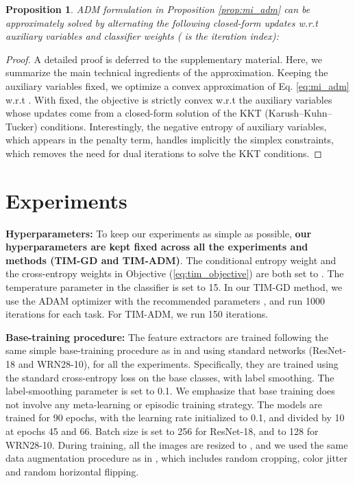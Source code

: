 \documentclass{article}
\newtheorem{prop}{Proposition}
\begin{document}
    		    \begin{prop}\label{prop:mi_adm_solution}
    		        ADM formulation in Proposition \ref{prop:mi_adm} can be approximately solved by alternating the following closed-form updates w.r.t auxiliary variables  and classifier weights  ( is the iteration index):
    		        
    		    \end{prop}
    		    \begin{proof}
    		    A detailed proof is deferred to the supplementary material. Here, we summarize the main technical ingredients of the approximation. Keeping the auxiliary variables  fixed, we optimize
    		    a convex approximation of Eq. \eqref{eq:mi_adm} w.r.t . With  fixed, the objective is strictly convex w.r.t the auxiliary variables  whose updates come from a closed-form solution of the KKT (Karush–Kuhn–Tucker) conditions. Interestingly, the negative entropy of auxiliary variables, which appears in the penalty term, handles implicitly the simplex constraints, which removes the need for dual iterations to solve the KKT conditions.
    		    \end{proof}


 
\section{Experiments}

    \textbf{Hyperparameters: } To keep our experiments as simple as possible, \textbf{our hyperparameters are kept fixed across all the experiments and methods (TIM-GD and TIM-ADM)}. The conditional entropy weight  and the cross-entropy weights  in Objective (\ref{eq:tim_objective}) are both set to . The temperature parameter  in the classifier is set to 15. 
In our TIM-GD method, we use the ADAM optimizer with the recommended parameters \cite{kingma2014adam}, and run 1000 iterations for each task. For TIM-ADM, we run 150 iterations.
    
    \textbf{Base-training procedure:} The feature extractors are trained following the same simple base-training procedure as in \cite{Laplacian} and using standard networks (ResNet-18 and WRN28-10), for all the experiments. Specifically, they are trained using the standard cross-entropy loss on the base classes, with label smoothing. The label-smoothing parameter is set to 0.1. We emphasize that base training does not involve any meta-learning or episodic training strategy. The models are trained for 90 epochs, with the learning rate initialized to 0.1, and divided by 10 at epochs 45 and 66. Batch size is set to 256 for ResNet-18, and to 128 for WRN28-10. During training, all the images are resized to , and we used the same data augmentation procedure as in \cite{Laplacian}, which includes random cropping, color jitter  and random horizontal flipping. 
\end{document}
